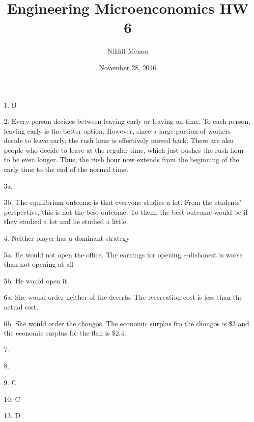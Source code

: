 \documentclass{article}
\title{Engineering Microenconomics HW 6}
\author{Nikhil Menon}
\date{November 28, 2016}
\begin{document}
\maketitle

1. B

2. Every person decides between leaving early or leaving on-time. To each person, leaving early is the better option. However, since a large portion of workers decide to leave early, the rush hour is effectively moved back. There are also people who decide to leave at the regular time, which just pushes the rush hour to be even longer. Thus, the rush hour now extends from the beginning of the early time to the end of the normal time.

3a.

3b. The equilibrium outcome is that everyone studies a lot. From the students' perspective, this is not the best outcome. To them, the best outcome would be if they studied a lot and he studied a little. 

4. Neither player has a dominant strategy

5a. He would not open the office. The earnings for opening +dishonest is worse than not opening at all

5b. He would open it. 

6a. She would order neither of the deserts. The reservation cost is less than the actual cost.

6b. She would order the chongos. The economic surplus fro the chongos is \$3 and the economic surplus for the flan is \$2.4.

7.

8. 

9. C

10. C

13. D


 
\end{document}
